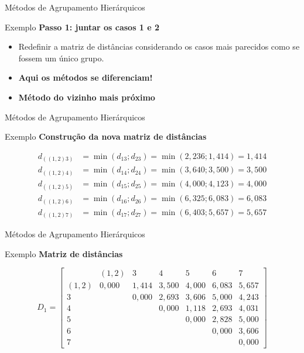 \documentclass[
  ignorenonframetext,
  aspectratio=169,
]{beamer}
\begin{document}
\begin{frame}{Métodos de Agrupamento Hierárquicos}
\label{muxe9todos-de-agrupamento-hieruxe1rquicos-15}
\begin{block}{Exemplo}
\label{exemplo-4}
\textbf{Passo 1: juntar os casos 1 e 2}

\begin{itemize}
\item
  Redefinir a matriz de distâncias considerando os casos mais parecidos
  como se fossem um único grupo.
\item
  \textbf{Aqui os métodos se diferenciam!}
\item
  \textbf{Método do vizinho mais próximo}
\end{itemize}
\end{block}
\end{frame}

\begin{frame}{Métodos de Agrupamento Hierárquicos}
\label{muxe9todos-de-agrupamento-hieruxe1rquicos-16}
\begin{block}{Exemplo}
\label{exemplo-5}
\textbf{Construção da nova matriz de distâncias}

\[
\begin{aligned}
d_{((1,2)3)} &=  \min(d_{13};d_{23}) = \min(2,236; 1,414) = 1,414 \\[6pt]
d_{((1,2)4)} &=  \min(d_{14};d_{24}) = \min(3,640; 3,500) = 3,500 \\[6pt]
d_{((1,2)5)} &=  \min(d_{15};d_{25}) = \min(4,000; 4,123) = 4,000 \\[6pt]
d_{((1,2)6)} &=  \min(d_{16};d_{26}) = \min(6,325; 6,083) = 6,083 \\[6pt]
d_{((1,2)7)} &=  \min(d_{17};d_{27}) = \min(6,403; 5,657) = 5,657
\end{aligned}
\]
\end{block}
\end{frame}

\begin{frame}{Métodos de Agrupamento Hierárquicos}
\label{muxe9todos-de-agrupamento-hieruxe1rquicos-17}
\begin{block}{Exemplo}
\label{exemplo-6}
\textbf{Matriz de distâncias}

\[D_1 = \left[ \begin{matrix}
&(1,2)&3&4&5&6&7\\ 
(1,2)& 0,000 & 1,414 & 3,500 & 4,000 & 6,083 & 5,657 \\
3  &  & 0,000 & 2,693 & 3,606 & 5,000 & 4,243 \\
4  &  &  & 0,000 & 1,118 & 2,693 & 4,031 \\
5 &  &  &  & 0,000 & 2,828 & 5,000 \\
6  &  &  &  &  & 0,000 & 3,606 \\
7  &  &  &  &  &  & 0,000
                    \end{matrix} \right]\]
\end{block}
\end{frame}
\end{document}
